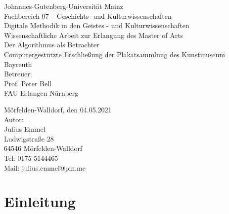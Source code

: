 \documentclass[a4paper,12pt,ngerman]{article}
\begin{document}
	\begin{titlepage}
	\begin{singlespace}
		\begin{center}	
			{\large Johannes-Gutenberg-Universität Mainz}\\
			\vspace{0.5cm}
			{\large Fachbereich 07 – Geschichts- und Kulturwissenschaften}\\
			\vspace{0.5cm}
			{\large Digitale Methodik in den Geistes - und Kulturwissenschaften}\\
			\vspace{1cm}
			{\large Wissenschaftliche Arbeit zur Erlangung des Master of Arts}\\
			\vspace{2cm}
			{\Huge Der Algorithmus als Betrachter \\ Computergestützte Erschließung der Plakatsammlung des Kunstmuseum Bayreuth}\\
			\vspace{2cm}
			{\large Betreuer: \\ Prof. Peter Bell \\ FAU Erlangen Nürnberg}\\
			\vspace{2cm}
		\end{center}
		\begin{flushright}
			{\large Mörfelden-Walldorf, den 04.05.2021}\\
			\vspace{0.5cm}
			{\large Autor: \\ Julius Emmel \\ Ludwigstraße 28 \\ 64546 Mörfelden-Walldorf}\\
			\vspace{0.5cm}
			{\large Tel: 0175 5144465 \\ Mail: julius.emmel@pm.me}
		\end{flushright}
	\restoregeometry
	\end{singlespace}
	\end{titlepage}

\newpage

\thispagestyle{empty}
\tableofcontents

\newpage

\section{Einleitung}
\end{document}
